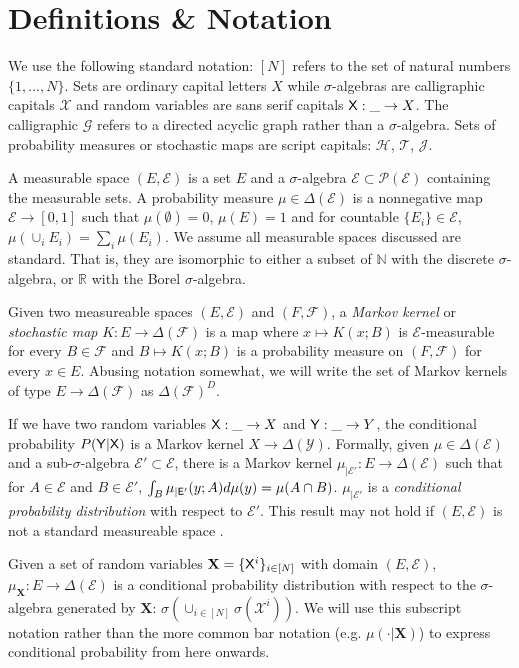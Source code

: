 \section{Definitions \& Notation}\label{sec:dfin}

We use the following standard notation: $[N]$ refers to the set of natural numbers $\{1,...,N\}$. Sets are ordinary capital letters $X$ while $\sigma$-algebras are calligraphic capitals $\mathcal{X}$ and random variables are sans serif capitals $\mathsf{X}:\_\to X$. The calligraphic $\mathcal{G}$ refers to a directed acyclic graph rather than a $\sigma$-algebra. Sets of probability measures or stochastic maps are script capitals: $\mathscr{H}$, $\mathscr{T}$, $\mathscr{J}$.

A measurable space $(E,\mathcal{E})$ is a set $E$ and a $\sigma$-algebra $\mathcal{E}\subset\mathcal{P}(\mathcal{E})$ containing the measurable sets. A probability measure $\mu\in \Delta(\mathcal{E})$ is a nonnegative map $\mathcal{E}\to[0,1]$ such that $\mu(\emptyset)=0$, $\mu(E)=1$ and for countable $\{E_i\}\in \mathcal{E}$, $\mu(\cup_i E_i) = \sum_i \mu(E_i)$. We assume all measurable spaces discussed are standard. That is, they are isomorphic to either a subset of $\mathbb{N}$ with the discrete $\sigma$-algebra, or $\mathbb{R}$ with the Borel $\sigma$-algebra.

Given two measureable spaces $(E,\mathcal{E})$ and $(F,\mathcal{F})$, a \emph{Markov kernel} or \emph{stochastic map} $K:E\to \Delta(\mathcal{F})$ is a map where $x\mapsto K(x;B)$ is $\mathcal{E}$-measurable for every $B\in\mathcal{F}$ and $B\mapsto K(x;B)$ is a probability measure on $(F,\mathcal{F})$ for every $x\in E$. Abusing notation somewhat, we will write the set of Markov kernels of type $E\to \Delta(\mathcal{F})$ as $\Delta(\mathcal{F})^D$. 

If we have two random variables $\mathsf{X}:\_\to X$ and $\mathsf{Y}:\_\to Y$, the conditional probability $P(\mathsf{Y}|\mathsf{X})$ is a Markov kernel $X\to \Delta(\mathcal{Y})$. Formally, given $\mu\in \Delta(\mathcal{E})$ and a sub-$\sigma$-algebra $\mathcal{E}'\subset\mathcal{E}$, there is a Markov kernel $\mu_{|\mathcal{E}'}:E\to\Delta(\mathcal{E})$ such that for $A\in\mathcal{E}$ and $B\in \mathcal{E}'$, $\int_B \mu_{|\mathsf{E}'}(y;A) d\mu(y) = \mu(A\cap B)$. $\mu_{|\mathcal{E}'}$ is a \emph{conditional probability distribution} with respect to $\mathcal{E}'$. This result may not hold if $(E,\mathcal{E})$ is not a standard measureable space \citep{cinlar_probability_2011}.

Given a set of random variables $\mathbf{X}=\{\mathsf{X}^i\}_{i\in [N]}$ with domain $(E,\mathcal{E})$, $\mu_{\mathbf{X}}:E\to \Delta(\mathcal{E})$ is a conditional probability distribution with respect to the $\sigma$-algebra generated by $\mathbf{X}$: $\sigma(\cup_{i\in[N]}\sigma(\mathcal{X}^i))$.  We will use this subscript notation rather than the more common bar notation (e.g. $\mu(\cdot|\mathbf{X})$) to express conditional probability from here onwards.

